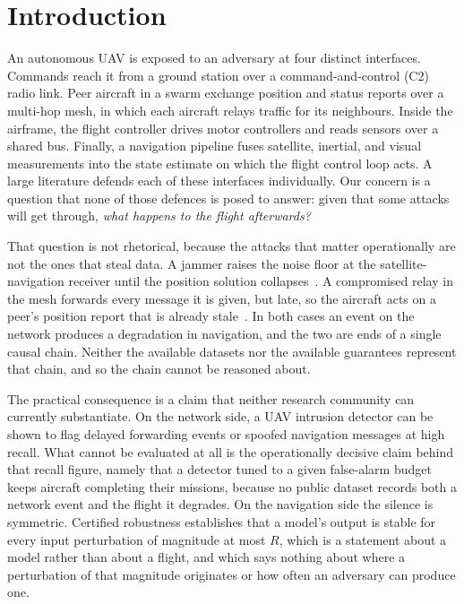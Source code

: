 \section{Introduction}
\label{sec:intro}
An autonomous UAV is exposed to an adversary at four distinct interfaces.
Commands reach it from a ground station over a command-and-control (C2) radio
link. Peer aircraft in a swarm exchange position and status reports over a
multi-hop mesh, in which each aircraft relays traffic for its neighbours. Inside
the airframe, the flight controller drives motor controllers and reads sensors
over a shared bus. Finally, a navigation pipeline fuses satellite, inertial, and
visual measurements into the state estimate on which the flight control loop
acts. A large literature defends each of these interfaces individually. Our
concern is a question that none of those defences is posed to answer: given that
some attacks will get through, \emph{what happens to the flight afterwards?}

That question is not rhetorical, because the attacks that matter operationally
are not the ones that steal data. A jammer raises the noise floor at the
satellite-navigation receiver until the position solution
collapses~\cite{kassas2022jammer}. A compromised relay in the mesh forwards
every message it is given, but late, so the aircraft acts on a peer's position
report that is already stale~\cite{datamut2026,lou2019timedelay}. In both
cases an event on the network produces a degradation in navigation, and the two
are ends of a single causal chain. Neither the available datasets nor the
available guarantees represent that chain, and so the chain cannot be reasoned
about.

The practical consequence is a claim that neither research community can
currently substantiate. On the network side, a UAV intrusion detector can be
shown to flag delayed forwarding events or spoofed navigation messages at high
recall. What cannot be evaluated at all is the operationally decisive claim
behind that recall figure, namely that a detector tuned to a given false-alarm
budget keeps aircraft completing their missions, because no public dataset
records both a network event and the flight it degrades. On the navigation side
the silence is symmetric. Certified robustness establishes that a model's output
is stable for every input perturbation of magnitude at most $R$, which is a
statement about a model rather than about a flight, and which says nothing about
where a perturbation of that magnitude originates or how often an adversary can
produce one.

